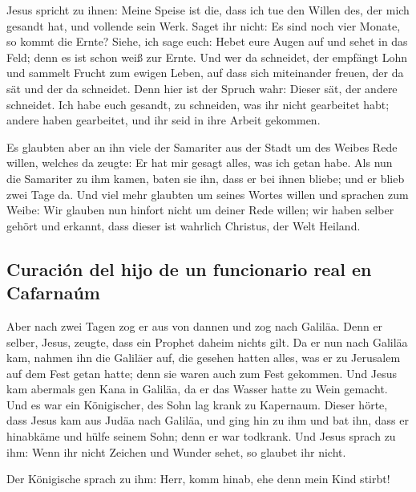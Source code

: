  Jesus spricht zu ihnen: Meine Speise ist die, dass ich
tue den Willen des, der mich gesandt hat, und vollende sein Werk.
 Saget ihr nicht: Es sind noch vier Monate, so kommt die
Ernte? Siehe, ich sage euch: Hebet eure Augen auf und sehet in das Feld;
denn es ist schon weiß zur Ernte.  Und wer da schneidet,
der empfängt Lohn und sammelt Frucht zum ewigen Leben, auf dass sich
miteinander freuen, der da sät und der da schneidet. 
Denn hier ist der Spruch wahr: Dieser sät, der andere schneidet.
 Ich habe euch gesandt, zu schneiden, was ihr nicht
gearbeitet habt; andere haben gearbeitet, und ihr seid in ihre Arbeit
gekommen.

 Es glaubten aber an ihn viele der Samariter aus der
Stadt um des Weibes Rede willen, welches da zeugte: Er hat mir gesagt
alles, was ich getan habe.  Als nun die Samariter zu ihm
kamen, baten sie ihn, dass er bei ihnen bliebe; und er blieb zwei Tage
da.  Und viel mehr glaubten um seines Wortes willen
 und sprachen zum Weibe: Wir glauben nun hinfort nicht um
deiner Rede willen; wir haben selber gehört und erkannt, dass dieser ist
wahrlich Christus, der Welt Heiland.

\hypertarget{curaciuxf3n-del-hijo-de-un-funcionario-real-en-cafarnauxfam}{%
\subsection{Curación del hijo de un funcionario real en
Cafarnaúm}\label{curaciuxf3n-del-hijo-de-un-funcionario-real-en-cafarnauxfam}}

 Aber nach zwei Tagen zog er aus von dannen und zog nach
Galiläa.  Denn er selber, Jesus, zeugte, dass ein Prophet
daheim nichts gilt.  Da er nun nach Galiläa kam, nahmen
ihn die Galiläer auf, die gesehen hatten alles, was er zu Jerusalem auf
dem Fest getan hatte; denn sie waren auch zum Fest gekommen.
 Und Jesus kam abermals gen Kana in Galiläa, da er das
Wasser hatte zu Wein gemacht.  Und es war ein
Königischer, des Sohn lag krank zu Kapernaum. Dieser hörte, dass Jesus
kam aus Judäa nach Galiläa, und ging hin zu ihm und bat ihn, dass er
hinabkäme und hülfe seinem Sohn; denn er war todkrank. 
Und Jesus sprach zu ihm: Wenn ihr nicht Zeichen und Wunder sehet, so
glaubet ihr nicht.

 Der Königische sprach zu ihm: Herr, komm hinab, ehe denn
mein Kind stirbt!

